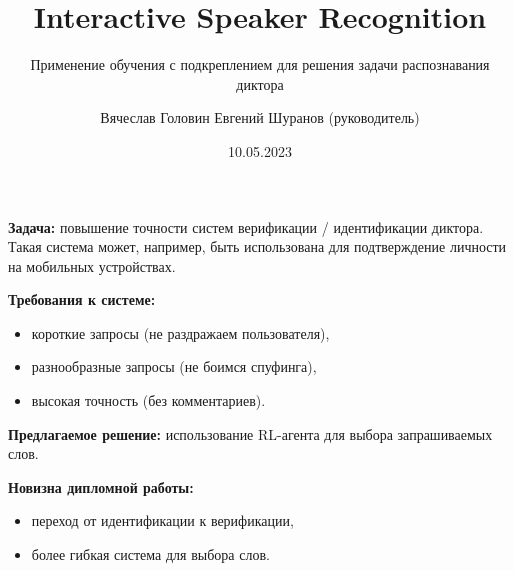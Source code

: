\documentclass[aspectratio=169]{beamer}
\title{Interactive Speaker Recognition}
\subtitle{Применение обучения с подкреплением для решения задачи распознавания
          диктора}
\author[В.С.~Головин]{Вячеслав Головин \texorpdfstring{\newline}{, }
    {\small Евгений Шуранов (руководитель)}}
\institute[ВШЭ]{Huawei CBG AI и ФКН ВШЭ СПб}
\date{10.05.2023}
\begin{document}
\frame{\titlepage}

\begin{frame}{}
    \textbf{Задача:} повышение точности систем верификации / идентификации
    диктора. Такая система может, например, быть использована для подтверждение
    личности на мобильных устройствах.\vspace{1em}

    \textbf{Требования к системе:}
    \begin{itemize}
        \item короткие запросы (не раздражаем пользователя),
        \item разнообразные запросы (не боимся спуфинга),
        \item высокая точность (без комментариев).
    \end{itemize}\vspace{1em}

    \textbf{Предлагаемое решение:} использование RL-агента для выбора
    запрашиваемых слов.\vspace{1em}

    \textbf{Новизна дипломной работы:}
    \begin{itemize}
        \item переход от идентификации к верификации,
        \item более гибкая система для выбора слов.
    \end{itemize}
\end{frame}
\end{document}
